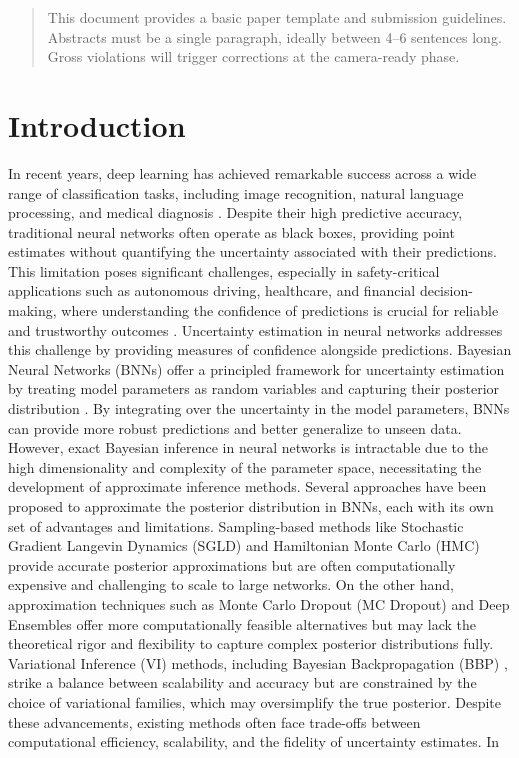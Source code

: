 \documentclass{article}
\begin{document}
\printAffiliationsAndNotice{\icmlEqualContribution} %

\begin{abstract}
This document provides a basic paper template and submission guidelines.
Abstracts must be a single paragraph, ideally between 4--6 sentences long.
Gross violations will trigger corrections at the camera-ready phase.
\end{abstract}

\section{Introduction}\label{sec:intro}

In recent years, deep learning has achieved remarkable success across a wide range of classification tasks, including image recognition, natural language processing, and medical diagnosis \cite{lecun2015deep}. Despite their high predictive accuracy, traditional neural networks often operate as black boxes, providing point estimates without quantifying the uncertainty associated with their predictions. This limitation poses significant challenges, especially in safety-critical applications such as autonomous driving, healthcare, and financial decision-making, where understanding the confidence of predictions is crucial for reliable and trustworthy outcomes \cite{kendall2017uncertainties}. Uncertainty estimation in neural networks addresses this challenge by providing measures of confidence alongside predictions. Bayesian Neural Networks (BNNs) offer a principled framework for uncertainty estimation by treating model parameters as random variables and capturing their posterior distribution \cite{blundell15}. By integrating over the uncertainty in the model parameters, BNNs can provide more robust predictions and better generalize to unseen data. However, exact Bayesian inference in neural networks is intractable due to the high dimensionality and complexity of the parameter space, necessitating the development of approximate inference methods. Several approaches have been proposed to approximate the posterior distribution in BNNs, each with its own set of advantages and limitations. Sampling-based methods like Stochastic Gradient Langevin Dynamics (SGLD) \cite{} and Hamiltonian Monte Carlo (HMC) \cite{neal12} provide accurate posterior approximations but are often computationally expensive and challenging to scale to large networks. On the other hand, approximation techniques such as Monte Carlo Dropout (MC Dropout) \cite{gal16} and Deep Ensembles \cite{lakshminarayanan17} offer more computationally feasible alternatives but may lack the theoretical rigor and flexibility to capture complex posterior distributions fully. Variational Inference (VI) methods, including Bayesian Backpropagation (BBP) \cite{blundell15}, strike a balance between scalability and accuracy but are constrained by the choice of variational families, which may oversimplify the true posterior. Despite these advancements, existing methods often face trade-offs between computational efficiency, scalability, and the fidelity of uncertainty estimates. In 
\end{document}
